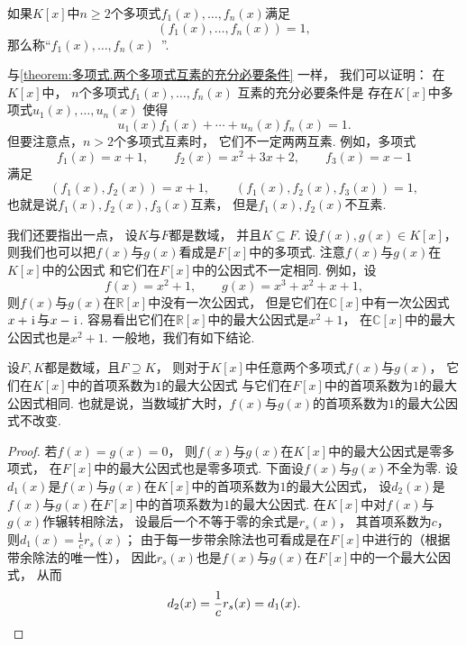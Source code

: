 \begin{definition}
如果\(K[x]\)中\(n\geq2\)个多项式\(f_1(x),\dotsc,f_n(x)\)满足\[
	(f_1(x),\dotsc,f_n(x)) = 1,
\]
那么称“\(f_1(x),\dotsc,f_n(x)\)~”.
\end{definition}

与\cref{theorem:多项式.两个多项式互素的充分必要条件} 一样，
我们可以证明：
在\(K[x]\)中，
\(n\)个多项式\(f_1(x),\dotsc,f_n(x)\)
互素的充分必要条件是
存在\(K[x]\)中多项式\(u_1(x),\dotsc,u_n(x)\)
使得\[
	u_1(x) f_1(x) + \dotsb + u_n(x) f_n(x) = 1.
\]
但要注意点，\(n>2\)个多项式互素时，
它们不一定两两互素.
例如，多项式\[
	f_1(x) = x+1, \qquad
	f_2(x) = x^2+3x+2, \qquad
	f_3(x) = x-1
\]满足\[
	(f_1(x),f_2(x))=x+1, \qquad
	(f_1(x),f_2(x),f_3(x))=1,
\]
也就是说\(f_1(x),f_2(x),f_3(x)\)互素，
但是\(f_1(x),f_2(x)\)不互素.

我们还要指出一点，
设\(K\)与\(F\)都是数域，
并且\(K \subseteq F\).
设\(f(x),g(x) \in K[x]\)，
则我们也可以把\(f(x)\)与\(g(x)\)看成是\(F[x]\)中的多项式.
注意\(f(x)\)与\(g(x)\)在\(K[x]\)中的公因式
和它们在\(F[x]\)中的公因式不一定相同.
例如，设\[
	f(x) = x^2+1, \qquad
	g(x) = x^3+x^2+x+1,
\]
则\(f(x)\)与\(g(x)\)在\(\mathbb{R}[x]\)中没有一次公因式，
但是它们在\(\mathbb{C}[x]\)中有一次公因式\(x+\kern1pt\mathrm{i}\kern1pt\)与\(x-\kern1pt\mathrm{i}\kern1pt\).
容易看出它们在\(\mathbb{R}[x]\)中的最大公因式是\(x^2+1\)，
在\(\mathbb{C}[x]\)中的最大公因式也是\(x^2+1\).
一般地，我们有如下结论.

\begin{proposition}
设\(F,K\)都是数域，且\(F \supseteq K\)，
则对于\(K[x]\)中任意两个多项式\(f(x)\)与\(g(x)\)，
它们在\(K[x]\)中的首项系数为\(1\)的最大公因式
与它们在\(F[x]\)中的首项系数为\(1\)的最大公因式相同.
也就是说，当数域扩大时，\(f(x)\)与\(g(x)\)的首项系数为\(1\)的最大公因式不改变.
\begin{proof}
若\(f(x)=g(x)=0\)，
则\(f(x)\)与\(g(x)\)在\(K[x]\)中的最大公因式是零多项式，
在\(F[x]\)中的最大公因式也是零多项式.
下面设\(f(x)\)与\(g(x)\)不全为零.
设\(d_1(x)\)是\(f(x)\)与\(g(x)\)在\(K[x]\)中的首项系数为\(1\)的最大公因式，
设\(d_2(x)\)是\(f(x)\)与\(g(x)\)在\(F[x]\)中的首项系数为\(1\)的最大公因式.
在\(K[x]\)中对\(f(x)\)与\(g(x)\)作辗转相除法，
设最后一个不等于零的余式是\(r_s(x)\)，
其首项系数为\(c\)，
则\(d_1(x) = \frac1c r_s(x)\)；
由于每一步带余除法也可看成是在\(F[x]\)中进行的（根据带余除法的唯一性），
因此\(r_s(x)\)也是\(f(x)\)与\(g(x)\)在\(F[x]\)中的一个最大公因式，
从而\[
	d_2(x) = \frac1c r_s(x)
	= d_1(x).
	\qedhere
\]
\end{proof}
\end{proposition}

